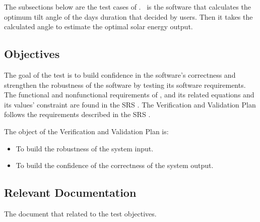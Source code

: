 \documentclass[12pt, titlepage]{article}
\begin{document}
The subsections below are the test cases of \progname. \progname ~is the
software that calculates the optimum tilt angle of the days duration that
decided by users. Then it takes the calculated angle to estimate the optimal
solar energy output.


\subsection{Objectives}\label{Objectives}

The goal of the test is to build confidence in the software's correctness and
strengthen the robustness of the software by testing its software requirements. The functional and nonfunctional requirements of \progname, and its related equations and its values' constraint are found in the SRS \cite{YS2019}. The Verification and Validation Plan follows the requirements described in the SRS \cite{YS2019}.

The object of the Verification and Validation Plan is:
\noindent \begin{itemize}

\item[ ] To build the robustness of the system input.
\item[ ] To build the confidence of the correctness of the system output.

\noindent \end{itemize}




\subsection{Relevant Documentation}\label{RD}

The document that related to the test objectives.
\end{document}
